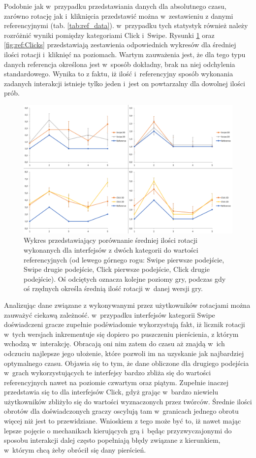 \documentclass[a4paper,12pt,numbers=noenddot]{report}
\begin{document}
Podobnie jak w~przypadku przedstawiania danych dla absolutnego czasu, zarówno rotację jak i~kliknięcia przedstawić można w~zestawieniu z danymi referencyjnymi (tab. \ref{tab:ref_data}). w~przypadku tych statystyk również należy rozróżnić wyniki pomiędzy kategoriami Click i~Swipe. Rysunki
\ref{fig:ref:rotations} oraz \ref{fig:ref:Clicks} przedstawiają zestawienia odpowiednich wykresów dla średniej ilości rotacji i~kliknięć na poziomach. Wartym zauważenia jest, że dla tego typu danych referencja określona jest w~sposób dokładny, brak na niej odchylenia standardowego. Wynika to z faktu, iż ilość i~referencyjny sposób wykonania zadanych interakcji istnieje tylko jeden i~jest on powtarzalny dla dowolnej ilości prób.

\begin{figure}[h!]
	\centering
  	\includegraphics[width=\linewidth]{diag/ref_rotations.png}
	\caption{Wykres przedstawiający porównanie średniej ilości rotacji wykonanych dla interfejsów z dwóch kategorii do wartości referencyjnych (od lewego górnego rogu: Swipe pierwsze podejście, Swipe drugie podejście, Click pierwsze podejście, Click drugie podejście). Oś odciętych oznacza kolejne poziomy gry, podczas gdy oś rzędnych określa średnią ilość rotacji w~danej wersji gry.}
	\label{fig:ref:rotations}
\end{figure}

Analizując dane związane z wykonywanymi przez użytkowników rotacjami można zauważyć ciekawą zależność. w~przypadku interfejsów kategorii Swipe doświadczeni gracze zupełnie podświadomie wykorzystują fakt, iż licznik rotacji w~tych wersjach inkrementuje się dopiero po puszczeniu pierścienia, z którym wchodzą w~interakcję. Obracają oni nim zatem do czasu aż znajdą w~ich odczuciu najlepsze jego ułożenie, które pozwoli im na uzyskanie jak najbardziej optymalnego czasu. Objawia się to tym, że dane obliczone dla drugiego podejścia w~grach wykorzystujących te interfejsy bardzo zbliża się do wartości referencyjnych nawet na poziomie czwartym oraz piątym. Zupełnie inaczej przedstawia się to dla interfejsów Click, gdyż grając w~bardzo niewielu użytkowników zbliżyło się do wartości wyznaczonych przez twórców. Średnie ilości obrotów dla doświadczonych graczy oscylują tam w~granicach jednego obrotu więcej niż jest to przewidziane. Wnioskiem z tego może być to, iż nawet mając lepsze pojęcie o mechanikach kierujących grą i~będąc przyzwyczajonymi do sposobu interakcji dalej często popełniają błędy związane z kierunkiem, w~którym chcą żeby obrócił się dany pierścień.
\end{document}
